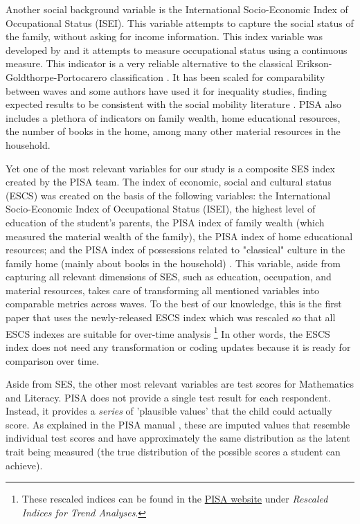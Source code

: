 \documentclass[11pt, a4paper]{article}\usepackage[]{graphicx}\usepackage[]{color}
\begin{document}
Another social background variable is the International Socio-Economic Index of Occupational Status (ISEI). This variable attempts to capture the social status of the family, without asking for income information. This index variable was developed by \citet{ganzeboom1996, ganzeboom2010} and it attempts to measure occupational status using a continuous measure. This indicator is a very reliable alternative to the  classical Erikson-Goldthorpe-Portocarero classification \citet{erikson1979}. It has been scaled for comparability between waves and some authors have used it for inequality studies, finding expected results to be consistent with the social mobility literature \citep{anna2016_global}. PISA also includes a plethora of indicators on family wealth, home educational resources, the number of books in the home, among many other material resources in the household.

Yet one of the most relevant variables for our study is a composite SES index created by the PISA team. The index of economic, social and cultural status (ESCS) was created on the basis of the following variables: the International Socio-Economic Index of Occupational Status (ISEI), the highest level of education of the student’s parents, the PISA index of family wealth (which measured the material wealth of the family), the PISA index of home educational resources; and the PISA index of possessions related to "classical" culture in the family home (mainly about books in the household) \citep{oecd_glance_2002}. This variable, aside from capturing all relevant dimensions of SES, such as education, occupation, and material resources, takes care of transforming all mentioned variables into comparable metrics across waves. To the best of our knowledge, this is the first paper that uses the newly-released ESCS index \citep{pisa_2015_results} which was rescaled so that all ESCS indexes are suitable for over-time analysis \footnote{These rescaled indices can be found in the \href{http://www.oecd.org/pisa/data/2015database/}{PISA website} under \emph{Rescaled Indices for Trend Analyses}.} In other words, the ESCS index does not need any transformation or coding updates because it is ready for comparison over time.

Aside from SES, the other most relevant variables are test scores for Mathematics and Literacy. PISA does not provide a single test result for each respondent. Instead, it provides a \emph{series} of 'plausible values' that the child could actually score. As explained in the PISA manual \citep{pisa2012_technical}, these are imputed values that resemble individual test scores and have approximately the same distribution as the latent trait being measured (the true distribution of the possible scores a student can achieve). 
\end{document}
